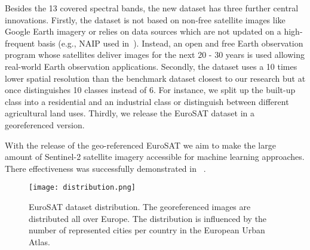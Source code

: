 \documentclass[journal]{IEEEtran}
\begin{document}
Besides the 13 covered spectral bands, the new dataset has three further central innovations. Firstly, the dataset is not based on non-free satellite images like Google Earth imagery or relies on data sources which are not updated on a high-frequent basis (e.g., NAIP used in~\cite{basu2015deepsat}). Instead, an open and free Earth observation program whose satellites deliver images for the next 20 - 30 years is used allowing real-world Earth observation applications. Secondly, the dataset uses a 10 times lower spatial resolution than the benchmark dataset closest to our research but at once distinguishes 10 classes instead of 6. For instance, we split up the built-up class into a residential and an industrial class or distinguish between different agricultural land uses. Thirdly, we release the EuroSAT dataset in a georeferenced version.

With the release of the geo-referenced EuroSAT we aim to make the large amount of Sentinel-2 satellite imagery accessible for machine learning approaches. There effectiveness was successfully demonstrated in ~\cite{chen2018training, roy2018semantic, helber2018introducing}. 






 

\begin{figure}[t!]
	\centering
	\texttt{[image: distribution.png]}
	\caption{EuroSAT dataset distribution. The georeferenced images are distributed all over Europe. The distribution is influenced by the number of represented cities per country in the European Urban Atlas.}
	\label{fig:distribution}
\end{figure}





    
\end{document}
